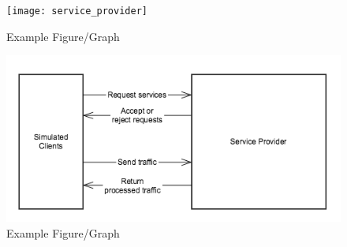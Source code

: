 \documentclass{sig-alternate}
\begin{document}
\begin{figure}[htb!]
  \begin{center}
    \texttt{[image: service\_provider]}
  \end{center}
  \vspace{-12pt}
  \caption{Example Figure/Graph}
  \label{fig:some_graph}
\end{figure}

\begin{figure}[htb!]
  \begin{center}
    \includegraphics[width=12cm]{system}
  \end{center}
  \vspace{-12pt}
  \caption{Example Figure/Graph}
  \label{fig:some_graph}
\end{figure}
\end{document}
